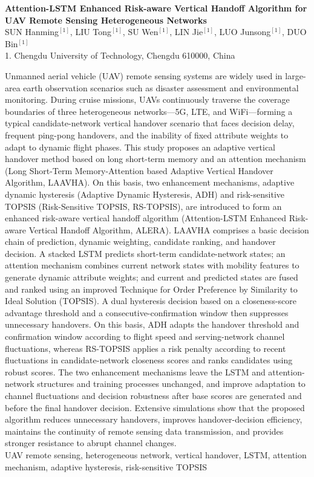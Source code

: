 \documentclass[10pt,a4paper]{ctexart}
\begin{document}
\begin{center}
{\bfseries Attention-LSTM Enhanced Risk-aware Vertical Handoff Algorithm for UAV Remote Sensing Heterogeneous Networks}\\[1mm]
SUN Hanming$^{[1]}$, LIU Tong$^{[1]}$, SU Wen$^{[1]}$, LIN Jie$^{[1]}$, LUO Junsong$^{[1]}$, DUO Bin$^{[1]}$\\[1mm]
{\small 1. Chengdu University of Technology, Chengdu 610000, China}
\end{center}
 Unmanned aerial vehicle (UAV) remote sensing systems are widely used in large-area earth observation scenarios such as disaster assessment and environmental monitoring. During cruise missions, UAVs continuously traverse the coverage boundaries of three heterogeneous networks---5G, LTE, and WiFi---forming a typical candidate-network vertical handover scenario that faces decision delay, frequent ping-pong handovers, and the inability of fixed attribute weights to adapt to dynamic flight phases. This study proposes an adaptive vertical handover method based on long short-term memory and an attention mechanism (Long Short-Term Memory-Attention based Adaptive Vertical Handover Algorithm, LAAVHA). On this basis, two enhancement mechanisms, adaptive dynamic hysteresis (Adaptive Dynamic Hysteresis, ADH) and risk-sensitive TOPSIS (Risk-Sensitive TOPSIS, RS-TOPSIS), are introduced to form an enhanced risk-aware vertical handoff algorithm (Attention-LSTM Enhanced Risk-aware Vertical Handoff Algorithm, ALERA). LAAVHA comprises a basic decision chain of prediction, dynamic weighting, candidate ranking, and handover decision. A stacked LSTM predicts short-term candidate-network states; an attention mechanism combines current network states with mobility features to generate dynamic attribute weights; and current and predicted states are fused and ranked using an improved Technique for Order Preference by Similarity to Ideal Solution (TOPSIS). A dual hysteresis decision based on a closeness-score advantage threshold and a consecutive-confirmation window then suppresses unnecessary handovers. On this basis, ADH adapts the handover threshold and confirmation window according to flight speed and serving-network channel fluctuations, whereas RS-TOPSIS applies a risk penalty according to recent fluctuations in candidate-network closeness scores and ranks candidates using robust scores. The two enhancement mechanisms leave the LSTM and attention-network structures and training processes unchanged, and improve adaptation to channel fluctuations and decision robustness after base scores are generated and before the final handover decision. Extensive simulations show that the proposed algorithm reduces unnecessary handovers, improves handover-decision efficiency, maintains the continuity of remote sensing data transmission, and provides stronger resistance to abrupt channel changes.\\[2mm]
 UAV remote sensing, heterogeneous network, vertical handover, LSTM, attention mechanism, adaptive hysteresis, risk-sensitive TOPSIS
\end{document}

